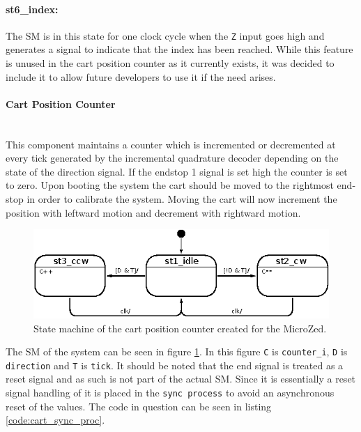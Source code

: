 \paragraph{st6\_index:} %
The SM is in this state for one clock cycle when the \texttt{Z} input goes high and generates a signal to indicate that the index has been reached.
While this feature is unused in the cart position counter as it currently exists, it was decided to include it to allow future developers to use it if the need arises.

\paragraph{Cart Position Counter}~\\ %
\label{par:cart_position_counter}
This component maintains a counter which is incremented or decremented at every tick generated by the incremental quadrature decoder depending on the state of the direction signal.
If the endstop 1 signal is set high the counter is set to zero.
Upon booting the system the cart should be moved to the rightmost end-stop in order to calibrate the system.
Moving the cart will now increment the position with leftward motion and decrement with rightward motion.

\begin{figure}[h]
	\centering
	\includegraphics[width=.75\linewidth]{graphics/count_state_machine}
	\caption[State machine of the cart position counter]{State machine of the cart position counter created for the MicroZed.}
	\label{fig:countstatemachine}
\end{figure}

The SM of the system can be seen in figure \ref{fig:countstatemachine}.
In this figure \texttt{C} is \texttt{counter\_i}, \texttt{D} is \texttt{direction} and \texttt{T} is \texttt{tick}.
It should be noted that the end signal is treated as a reset signal and as such is not part of the actual SM.
Since it is essentially a reset signal handling of it is placed in the \texttt{sync process} to avoid an asynchronous reset of the values.
The code in question can be seen in listing \ref{code:cart_sync_proc}.

